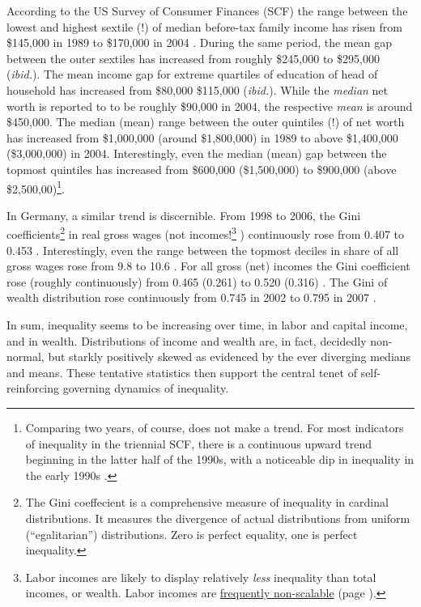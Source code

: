According to the US Survey of Consumer Finances (SCF) the range between the lowest and highest sextile (!) of median before-tax family income has risen from \$145,000 in 1989 to \$170,000 in 2004 \citep{Bucks2006}.
During the same period, the mean gap between the outer sextiles has increased from roughly \$245,000 to \$295,000 (\emph{ibid.}).
The mean income gap for extreme quartiles of education of head of household has increased from \$80,000 \$115,000 (\emph{ibid.}).
While the \emph{median} net worth is reported to to be roughly \$90,000 in 2004, the respective \emph{mean} is around \$450,000.
The median (mean) range between the outer quintiles (!) of net worth has increased from \$1,000,000 (around \$1,800,000) in 1989 to above \$1,400,000 (\$3,000,000) in 2004.
Interestingly, even the median (mean) gap between the topmost quintiles has increased from \$600,000 (\$1,500,000) to \$900,000 (above \$2,500,00)\footnote{Comparing two years, of course, does not make a trend.
For most indicators of inequality in the triennial SCF, there is a continuous upward trend beginning in the latter half of the 1990s, with a noticeable dip in inequality in the early 1990s \citep{Bucks2006}.}.

In Germany, a similar trend is discernible.
From 1998 to 2006, the Gini coefficients\footnote{
	The Gini coeffecient is a comprehensive measure of inequality in cardinal distributions.
It measures the divergence of actual distributions from uniform (``egalitarian'') distributions.
Zero is perfect equality, one is perfect inequality.}
in real gross wages (not incomes!\footnote{
	Labor incomes are likely to display relatively \emph{less} inequality than total incomes, or wealth.
Labor incomes are \hyperref[sec:Extremistan]{frequently non-scalable} (page \pageref{sec:Extremistan}).}
) continuously rose from 0.407 to 0.453 \citep[14]{Bundesregierung2006}.
Interestingly, even the range between the topmost deciles in share of all gross wages rose from 9.8 to 10.6 \citep[64]{Grabka2007a}.
For all gross (net) incomes the Gini coefficient rose (roughly continuously) from 0.465 (0.261) to 0.520 (0.316) \citeyearpar[82]{Grabka2007a}.
The Gini of wealth distribution rose continuously from 0.745 in 2002 to 0.795 in 2007 \citeyearpar[138]{Grabka2007a}.

In sum, inequality seems to be increasing over time, in labor and capital income, and in wealth.
Distributions of income and wealth are, in fact, decidedly non-normal, but starkly positively skewed as evidenced by the ever diverging medians and means.
These tentative statistics then support the central tenet of self-reinforcing governing dynamics of inequality.

